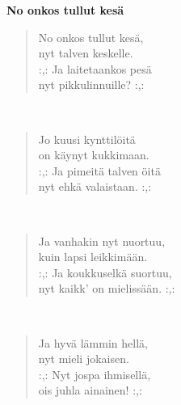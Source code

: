 \noindent\begin{minipage}{\linewidth}
\vspace{5pt}
\parbox[t]{0.85\linewidth}{\raggedright {\large\bf No onkos tullut kesä}\\[6pt]}
\begin{verse}
	No onkos tullut kesä,\\
	nyt talven keskelle.\\
	\hspace{0pt-\widthof{:,: }}:,: Ja laitetaankos pesä\\
	nyt pikkulinnuille? :,:\\
\end{verse}
\end{minipage}\\[10pt]
\noindent\begin{minipage}{\linewidth}
\begin{verse}
	Jo kuusi kynttilöitä\\
	on käynyt kukkimaan.\\
	\hspace{0pt-\widthof{:,: }}:,: Ja pimeitä talven öitä\\
	nyt ehkä valaistaan. :,:\\
\end{verse}
\end{minipage}\\[10pt]
\noindent\begin{minipage}{\linewidth}
\begin{verse}
	Ja vanhakin nyt nuortuu,\\
	kuin lapsi leikkimään.\\
	\hspace{0pt-\widthof{:,: }}:,: Ja koukkuselkä suortuu,\\
	nyt kaikk' on mielissään. :,:\\
\end{verse}
\end{minipage}\\[10pt]
\noindent\begin{minipage}{\linewidth}
\begin{verse}
	Ja hyvä lämmin hellä,\\
	nyt mieli jokaisen.\\
	\hspace{0pt-\widthof{:,: }}:,: Nyt jospa ihmisellä,\\
	ois juhla ainainen! :,:\\
\end{verse}
\end{minipage}\\[10pt]
